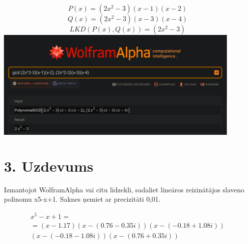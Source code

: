 \documentclass{article}
\begin{document}
\begin{equation*}
    P(x) = (2x^2-3)(x-1)(x-2)
\end{equation*}
\begin{equation*}
    Q(x) = (2x^2-3)(x-3)(x-4)
\end{equation*}
\begin{equation*}
    LKD(P(x), Q(x)) = (2x^2-3)
\end{equation*}
\includegraphics[width=0.9\textwidth, center]{2}

\section*{3. Uzdevums}
Izmantojot WolframAlpha vai citu līdzekli, sadaliet lineāros reizinātājos slaveno polinomu x5-x+1. Saknes ņemiet ar precizitāti 0,01.

\begin{gather*}
    x^5-x+1 = \\ = (x-1.17)(x-(0.76 - 0.35i))(x-(-0.18 + 1.08i))\\(x-(-0.18 - 1.08i))(x-(0.76 + 0.35i))
\end{gather*}
\end{document}
